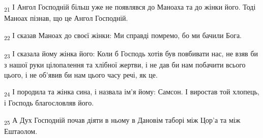 \begin{tcolorbox}
\textsubscript{21} І Ангол Господній більш уже не появлявся до Маноаха та до жінки його. Тоді Маноах пізнав, що це Ангол Господній.
\end{tcolorbox}
\begin{tcolorbox}
\textsubscript{22} І сказав Маноах до своєї жінки: Ми справді помремо, бо ми бачили Бога.
\end{tcolorbox}
\begin{tcolorbox}
\textsubscript{23} І сказала йому жінка його: Коли б Господь хотів був повбивати нас, не взяв би з нашої руки цілопалення та хлібної жертви, і не дав би нам побачити всього цього, і не об'явив би нам цього часу речі, як це.
\end{tcolorbox}
\begin{tcolorbox}
\textsubscript{24} І породила та жінка сина, і назвала ім'я йому: Самсон. І виростав той хлопець, і Господь благословляв його.
\end{tcolorbox}
\begin{tcolorbox}
\textsubscript{25} А Дух Господній почав діяти в ньому в Дановім таборі між Цор'а та між Ештаолом.
\end{tcolorbox}
